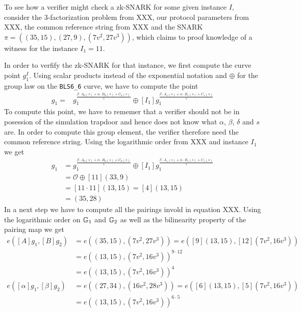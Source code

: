 \begin{example} To see how a verifier might check  
a zk-SNARK for some given instance $I$, consider the $3$-factorization problem from XXX, our protocol parameters from XXX, the common reference string from XXX and the SNARK $\pi=((35,15),(27,9),(7v^2,27v^3))$, which claims to proof knowledge of a witness for the instance $I_1=11$.

In order to verfify the zk-SNARK for that instance, we first compute the curve point $g_1^I$. Using scalar products instead of the exponential notation and $\oplus$ for the group law on the \texttt{BLS6\_6} curve, we have to compute the point
\begin{align*}
[I]g_1 = & g_1^{\frac{\beta\cdot A_{0}(s)+\alpha\cdot B_{0}(s)+C_{0}(s)}{\gamma}} \oplus [I_1]g_1^{\frac{\beta\cdot A_{1}(s)+\alpha\cdot B_{1}(s)+C_{1}(s)}{\gamma}}
\end{align*}
To compute this point, we have to rememer that a verifier should not be in posession of the simulation trapdoor and hence does not know what $\alpha$, $\beta$, $\delta$ and $s$ are. In order to compute this group element, the verifier therefore need the common reference string. Using the logarithmic order from XXX and instance $I_1$ we get
\begin{align*}
[I]g_1 & = g_1^{\frac{\beta\cdot A_{0}(s)+\alpha\cdot B_{0}(s)+C_{0}(s)}{\gamma}} \oplus [I_1]g_1^{\frac{\beta\cdot A_{1}(s)+\alpha\cdot B_{1}(s)+C_{1}(s)}{\gamma}}\\   
       & = \mathcal{O} \oplus [11](33,9)\\
       & = [11\cdot 11](13,15) = [4](13,15)\\
       & = (35,28)
\end{align*} 
In a next step we have to compute all the pairings invold in equation XXX. Using the logarithmic order on $\mathbb{G}_1$ and $\mathbb{G}_2$ as well as the bilinearity property of the pairing map we get
\begin{align*}
e([A]g_1,[B]g_2) & = e((35,15),(7v^2,27v^3))
                   = e([9](13,15),[12](7v^2,16v^3))\\
               & = e((13,15),(7v^2,16v^3))^{9\cdot 12}\\
               & = e((13,15),(7v^2,16v^3))^{4}\\
e([\alpha]g_1,[\beta]g_2) & = e((27,34),(16v^2,28v^3)) 
                            = e([6](13,15),[5](7v^2,16v^3))\\
               & = e((13,15),(7v^2,16v^3))^{6\cdot 5}\\

\end{align*}
\end{example}
